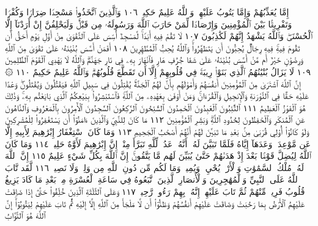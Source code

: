 إِمَّا يُعَذِّبُهُمْ وَإِمَّا يَتُوبُ عَلَيْهِمْۗ وَٱللَّهُ عَلِيمٌ حَكِيمࣱ ١٠٦
وَٱلَّذِينَ ٱتَّخَذُوا۟ مَسْجِدࣰا ضِرَارࣰا وَكُفْرࣰا وَتَفْرِيقَۢا بَيْنَ
ٱلْمُؤْمِنِينَ وَإِرْصَادࣰا لِّمَنْ حَارَبَ ٱللَّهَ وَرَسُولَهُۥ مِن قَبْلُۚ
وَلَيَحْلِفُنَّ إِنْ أَرَدْنَآ إِلَّا ٱلْحُسْنَىٰۖ وَٱللَّهُ يَشْهَدُ إِنَّهُمْ
لَكَٰذِبُونَ ١٠٧ لَا تَقُمْ فِيهِ أَبَدࣰاۚ لَّمَسْجِدٌ أُسِّسَ عَلَى ٱلتَّقْوَىٰ
مِنْ أَوَّلِ يَوْمٍ أَحَقُّ أَن تَقُومَ فِيهِۚ فِيهِ رِجَالࣱ يُحِبُّونَ أَن
يَتَطَهَّرُوا۟ۚ وَٱللَّهُ يُحِبُّ ٱلْمُطَّهِّرِينَ ١٠٨ أَفَمَنْ أَسَّسَ بُنْيَٰنَهُۥ
عَلَىٰ تَقْوَىٰ مِنَ ٱللَّهِ وَرِضْوَٰنٍ خَيْرٌ أَم مَّنْ أَسَّسَ بُنْيَٰنَهُۥ
عَلَىٰ شَفَا جُرُفٍ هَارࣲ فَٱنْهَارَ بِهِۦ فِي نَارِ جَهَنَّمَۗ وَٱللَّهُ لَا يَهْدِي
ٱلْقَوْمَ ٱلظَّٰلِمِينَ ١٠٩ لَا يَزَالُ بُنْيَٰنُهُمُ ٱلَّذِي بَنَوْا۟ رِيبَةࣰ
فِي قُلُوبِهِمْ إِلَّآ أَن تَقَطَّعَ قُلُوبُهُمْۗ وَٱللَّهُ عَلِيمٌ حَكِيمٌ ١١٠
۞ إِنَّ ٱللَّهَ ٱشْتَرَىٰ مِنَ ٱلْمُؤْمِنِينَ أَنفُسَهُمْ وَأَمْوَٰلَهُم
بِأَنَّ لَهُمُ ٱلْجَنَّةَۚ يُقَٰتِلُونَ فِي سَبِيلِ ٱللَّهِ فَيَقْتُلُونَ
وَيُقْتَلُونَۖ وَعْدًا عَلَيْهِ حَقࣰّا فِي ٱلتَّوْرَىٰةِ وَٱلْإِنجِيلِ
وَٱلْقُرْءَانِۚ وَمَنْ أَوْفَىٰ بِعَهْدِهِۦ مِنَ ٱللَّهِۚ فَٱسْتَبْشِرُوا۟
بِبَيْعِكُمُ ٱلَّذِي بَايَعْتُم بِهِۦۚ وَذَٰلِكَ هُوَ ٱلْفَوْزُ ٱلْعَظِيمُ ١١١
ٱلتَّٰٓئِبُونَ ٱلْعَٰبِدُونَ ٱلْحَٰمِدُونَ ٱلسَّٰٓئِحُونَ
ٱلرَّٰكِعُونَ ٱلسَّٰجِدُونَ ٱلْأٓمِرُونَ بِٱلْمَعْرُوفِ
وَٱلنَّاهُونَ عَنِ ٱلْمُنكَرِ وَٱلْحَٰفِظُونَ لِحُدُودِ ٱللَّهِۗ
وَبَشِّرِ ٱلْمُؤْمِنِينَ ١١٢ مَا كَانَ لِلنَّبِيِّ وَٱلَّذِينَ ءَامَنُوٓا۟
أَن يَسْتَغْفِرُوا۟ لِلْمُشْرِكِينَ وَلَوْ كَانُوٓا۟ أُو۟لِي قُرْبَىٰ
مِنۢ بَعْدِ مَا تَبَيَّنَ لَهُمْ أَنَّهُمْ أَصْحَٰبُ ٱلْجَحِيمِ ١١٣ وَمَا
كَانَ ٱسْتِغْفَارُ إِبْرَٰهِيمَ لِأَبِيهِ إِلَّا عَن مَّوْعِدَةࣲ وَعَدَهَآ
إِيَّاهُ فَلَمَّا تَبَيَّنَ لَهُۥٓ أَنَّهُۥ عَدُوࣱّ لِّلَّهِ تَبَرَّأَ مِنْهُۚ إِنَّ إِبْرَٰهِيمَ
لَأَوَّٰهٌ حَلِيمࣱ ١١٤ وَمَا كَانَ ٱللَّهُ لِيُضِلَّ قَوْمَۢا بَعْدَ إِذْ
هَدَىٰهُمْ حَتَّىٰ يُبَيِّنَ لَهُم مَّا يَتَّقُونَۚ إِنَّ ٱللَّهَ بِكُلِّ شَيْءٍ
عَلِيمٌ ١١٥ إِنَّ ٱللَّهَ لَهُۥ مُلْكُ ٱلسَّمَٰوَٰتِ وَٱلْأَرْضِۖ يُحْيِۦ
وَيُمِيتُۚ وَمَا لَكُم مِّن دُونِ ٱللَّهِ مِن وَلِيࣲّ وَلَا نَصِيرࣲ ١١٦
لَّقَد تَّابَ ٱللَّهُ عَلَى ٱلنَّبِيِّ وَٱلْمُهَٰجِرِينَ وَٱلْأَنصَارِ ٱلَّذِينَ
ٱتَّبَعُوهُ فِي سَاعَةِ ٱلْعُسْرَةِ مِنۢ بَعْدِ مَا كَادَ يَزِيغُ قُلُوبُ
فَرِيقࣲ مِّنْهُمْ ثُمَّ تَابَ عَلَيْهِمْۚ إِنَّهُۥ بِهِمْ رَءُوفࣱ رَّحِيمࣱ ١١٧
وَعَلَى ٱلثَّلَٰثَةِ ٱلَّذِينَ خُلِّفُوا۟ حَتَّىٰٓ إِذَا ضَاقَتْ عَلَيْهِمُ ٱلْأَرْضُ
بِمَا رَحُبَتْ وَضَاقَتْ عَلَيْهِمْ أَنفُسُهُمْ وَظَنُّوٓا۟ أَن لَّا مَلْجَأَ
مِنَ ٱللَّهِ إِلَّآ إِلَيْهِ ثُمَّ تَابَ عَلَيْهِمْ لِيَتُوبُوٓا۟ۚ إِنَّ ٱللَّهَ هُوَ ٱلتَّوَّابُ
